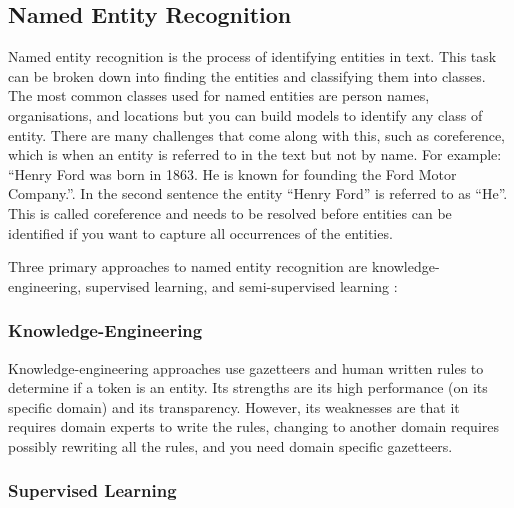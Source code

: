 \documentclass[11pt,oneside]{book}
\begin{document}
\subsection{Named Entity Recognition}

Named entity recognition is the process of identifying entities in text. This task can be broken down into finding the entities and classifying them into classes. The most common classes used for named entities are person names, organisations, and locations but you can build models to identify any class of entity. There are many challenges that come along with this, such as coreference, which is when an entity is referred to in the text but not by name. For example: “Henry Ford was born in 1863. He is known for founding the Ford Motor Company.”. In the second sentence the entity “Henry Ford” is referred to as “He”. This is called coreference and needs to be resolved before entities can be identified if you want to capture all occurrences of the entities.

Three primary approaches to named entity recognition are knowledge-engineering, supervised learning, and semi-supervised learning \citep{text_processing_lecture_5}:

\subsubsection{Knowledge-Engineering}

Knowledge-engineering approaches use gazetteers and human written rules to determine if a token is an entity. Its strengths are its high performance (on its specific domain) and its transparency. However, its weaknesses are that it requires domain experts to write the rules, changing to another domain requires possibly rewriting all the rules, and you need domain specific gazetteers.

\subsubsection{Supervised Learning}
\end{document}
